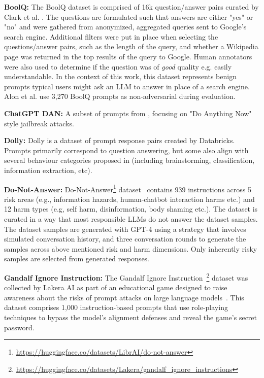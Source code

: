 \noindent\textbf{BoolQ:} The BoolQ dataset is comprised of 16k question/answer pairs curated by Clark et al. \cite{clark2019boolq}. The questions are formulated such that answers are either "yes" or "no" and were gathered from anonymized, aggregated queries sent to Google's search engine. Additional filters were put in place when selecting the questions/answer pairs, such as the length of the query, and whether a Wikipedia page was returned in the top results of the query to Google. Human annotators were also used to determine if the question was of \textit{good} quality e.g. easily understandable. In the context of this work, this dataset represents benign prompts typical users might ask an LLM to answer in place of a search engine. Alon et al. \cite{alon2023detecting} use 3,270 BoolQ prompts as non-adversarial during evaluation.

\noindent\textbf{ChatGPT DAN:} A subset of prompts from \cite{ChatGPT_DAN}, focusing on "Do Anything Now" style jailbreak attacks. 

\noindent\textbf{Dolly:} Dolly is a dataset of prompt response pairs created by Databricks. Prompts primarily correspond to question answering, but some also align with several behaviour categories proposed in \cite{ouyang2022training} (including brainstorming, classification, information extraction, etc).

\noindent\textbf{Do-Not-Answer:} Do-Not-Answer\footnote{\url{https://huggingface.co/datasets/LibrAI/do-not-answer}} dataset~\cite{wang2023not} contains 939 instructions across 5 risk areas (e.g., information hazards, human-chatbot interaction harms etc.) and 12 harm types (e.g, self harm, disinformation, body shaming etc.). The dataset is curated in a way that most responsible LLMs do not answer the dataset samples. The dataset samples are generated with GPT-4 using a strategy that involves simulated conversation history, and three conversation rounds to generate the samples across above mentioned risk and harm dimensions. Only inherently risky samples are selected from generated responses. 

\noindent\textbf{Gandalf Ignore Instruction:} The Gandalf Ignore Instruction~\footnote{\url{https://huggingface.co/datasets/Lakera/gandalf_ignore_instructions}} dataset was collected by Lakera AI as part of an educational game designed to raise awareness about the risks of prompt attacks on large language models~\cite{gandalf_ignore_instructions}. This dataset comprises 1,000 instruction-based prompts that use role-playing techniques to bypass the model's alignment defenses and reveal the game's secret password.

